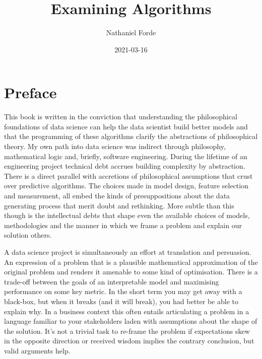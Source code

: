 \documentclass[]{tufte-book}
\title{Examining Algorithms}
\author{Nathaniel Forde}
\date{2021-03-16}
\theoremstyle{definition}
\theoremstyle{definition}
\theoremstyle{definition}
\theoremstyle{remark}
\begin{document}
\maketitle



{
\setcounter{tocdepth}{1}
\tableofcontents
}

\hypertarget{preface}{%
\chapter{Preface}\label{preface}}

This book is written in the conviction that understanding the philosophical foundations of data science can help the data scientist build better models and that the programming of these algorithms clarify the abstractions of philosophical theory. My own path into data science was indirect through philosophy, mathematical logic and, briefly, software engineering. During the lifetime of an engineering project technical debt accrues building complexity by abstraction. There is a direct parallel with accretions of philosophical assumptions that crust over predictive algorithms. The choices made in model design, feature selection and measurement, all embed the kinds of presuppositions about the data generating process that merit doubt and rethinking. More subtle than this though is the intellectual debts that shape even the available choices of models, methodologies and the manner in which we frame a problem and explain our solution others.

A data science project is simultaneously an effort at translation and persuasion. An expression of a problem that is a plausible mathematical approximation of the original problem and renders it amenable to some kind of optimisation. There is a trade-off between the goals of an interpretable model and maximising performance on some key metric. In the short term you may get away with a black-box, but when it breaks (and it will break), you had better be able to explain why. In a business context this often entails articulating a problem in a language familiar to your stakeholders laden with assumptions about the shape of the solution. It's not a trivial task to re-frame the problem if expectations skew in the opposite direction or received wisdom implies the contrary conclusion, but valid arguments help.
\end{document}
